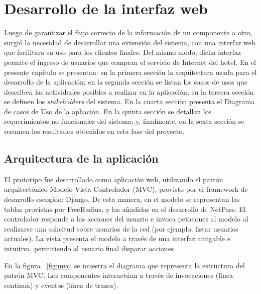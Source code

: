 \chapter{Desarrollo de la interfaz web}\label{chapter:Desarrollo de la interfaz web}

		Luego de garantizar el flujo correcto de la información de un componente a otro, surgió la necesidad de desarrollar una extensión del sistema, con una interfaz web que facilitara su uso para los clientes finales. Del mismo modo, dicha interfaz permite el ingreso de usuarios que compran el servicio de Internet del hotel.
\newline
\newline
\indent En el presente capítulo se presentan: en la primera sección la arquitectura usada para el desarrollo de la aplicación; en la segunda sección se listan los casos de usos que describen las actividades posibles a realizar en la aplicación; en la tercera sección se definen los \textit{stakeholders} del sistema. En la cuarta sección presenta el Diagrama de casos de Uso de la apliación. En la quinta sección se detallan los requerimientos no funcionales del sistema; y, finalmente, en la sexta sección se resumen los resultados obtenidos en esta fase del proyecto.

\section{Arquitectura de la aplicación} \label{sect:Arquitectura de la aplicacion}
		El prototipo fue desarrollado como aplicación web, utilizando el patrón arquitectónico Modelo-Vista-Controlador (MVC), provisto por el framework de desarrollo escogido: Django.
\newline
\newline		
\indent De esta manera, en el modelo se representan las tablas provistas por FreeRadius, y las añadidas en el desarrollo de NetPass. El controlador responde a las acciones del usuario e invoca peticiones al modelo al realizarse una solicitud sobre usuarios de la red (por ejemplo, listar usuarios actuales). La vista presenta el modelo a través de una interfaz amigable e intuitiva, permitiendo al usuario final disparar acciones.
		
		En la figura ~\ref{fig:mvc} se muestra el diagrama que representa la estructura del patrón MVC. Los componentes interactúan a través de invocaciones (línea continua) y eventos (línea de trazos).


